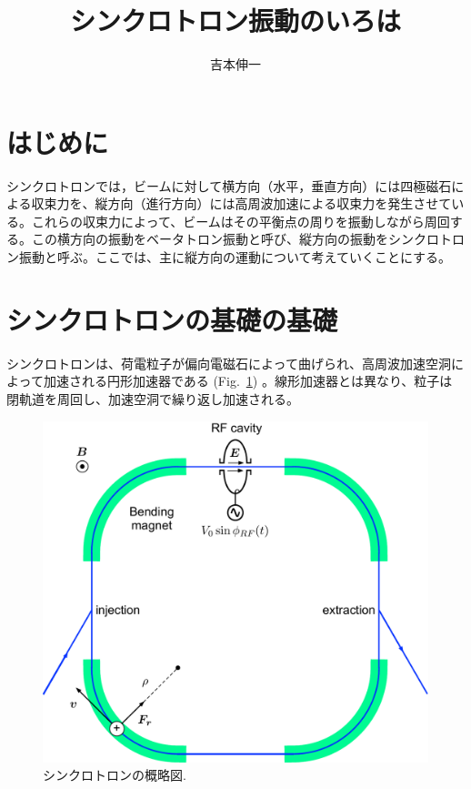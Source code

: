 \documentclass[10pt,a4paper]{ltjsarticle}
\begin{document}
\title{シンクロトロン振動のいろは}
\author{吉本伸一}
\maketitle
\tableofcontents
\clearpage

\section{はじめに}
シンクロトロンでは，ビームに対して横方向（水平，垂直方向）には四極磁石による収束力を、縦方向（進行方向）には高周波加速による収束力を発生させている。これらの収束力によって、ビームはその平衡点の周りを振動しながら周回する。この横方向の振動をベータトロン振動と呼び、縦方向の振動をシンクロトロン振動と呼ぶ。ここでは、主に縦方向の運動について考えていくことにする。

\section{シンクロトロンの基礎の基礎}
シンクロトロンは、荷電粒子が偏向電磁石によって曲げられ、高周波加速空洞によって加速される円形加速器である (Fig.~\ref{synchrotron}) 。線形加速器とは異なり、粒子は閉軌道を周回し、加速空洞で繰り返し加速される。
%
\begin{figure}[hbt]
  \begin{center}
    \includegraphics[width=12cm,clip]{synchrotron.pdf}
    \caption{シンクロトロンの概略図.}
   \label{synchrotron}
  \end{center}
\end{figure}
\end{document}
